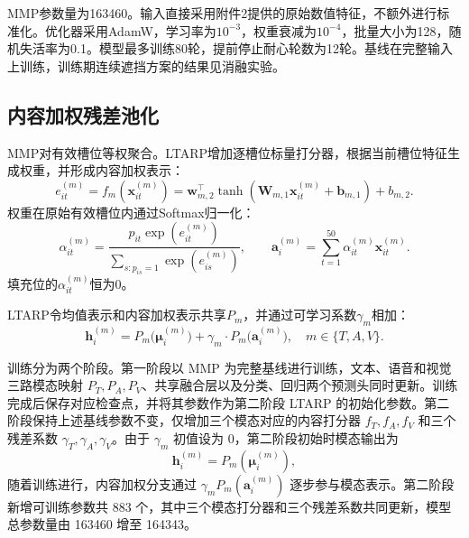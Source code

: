 \documentclass[UTF8,a4paper,11pt]{ctexart}
\begin{document}
MMP参数量为163460。输入直接采用附件2提供的原始数值特征，不额外进行标准化。优化器采用AdamW，学习率为$10^{-3}$，权重衰减为$10^{-4}$，批量大小为128，随机失活率为0.1。模型最多训练80轮，提前停止耐心轮数为12轮。基线在完整输入上训练，训练期连续遮挡方案的结果见消融实验。

\subsection{内容加权残差池化}\label{subsec:q2_pool}
MMP对有效槽位等权聚合。LTARP增加逐槽位标量打分器，根据当前槽位特征生成权重，并形成内容加权表示：
\begin{equation}
e_{it}^{(m)} = f_m(\mathbf x_{it}^{(m)}) = \mathbf w_{m,2}^\top \tanh(\mathbf W_{m,1} \mathbf x_{it}^{(m)} + \mathbf b_{m,1}) + b_{m,2}.
\end{equation}
权重在原始有效槽位内通过Softmax归一化：
\begin{equation}
\alpha_{it}^{(m)} = \frac{p_{it}\exp(e_{it}^{(m)})}{\sum_{s: p_{is}=1} \exp(e_{is}^{(m)})},\qquad
\mathbf a_i^{(m)} = \sum_{t=1}^{50} \alpha_{it}^{(m)} \mathbf x_{it}^{(m)}.
\label{eq:q2_alpha_softmax}
\end{equation}
填充位的$\alpha_{it}^{(m)}$恒为0。

LTARP令均值表示和内容加权表示共享$P_m$，并通过可学习系数$\gamma_m$相加：
\begin{equation}
\mathbf h_i^{(m)} = P_m\big(\boldsymbol\mu_i^{(m)}\big) + \gamma_m \cdot P_m\big(\mathbf a_i^{(m)}\big), \quad m \in \{T, A, V\}.
\label{eq:q2_residual_composite}
\end{equation}

训练分为两个阶段。第一阶段以 MMP 为完整基线进行训练，文本、语音和视觉三路模态映射 $P_T,P_A,P_V$、共享融合层以及分类、回归两个预测头同时更新。训练完成后保存对应检查点，并将其参数作为第二阶段 LTARP 的初始化参数。第二阶段保持上述基线参数不变，仅增加三个模态对应的内容打分器 $f_T,f_A,f_V$ 和三个残差系数 $\gamma_T,\gamma_A,\gamma_V$。由于 $\gamma_m$ 初值设为 0，第二阶段初始时模态输出为
\begin{equation}
\mathbf h_i^{(m)} = P_m(\boldsymbol\mu_i^{(m)}),
\end{equation}
随着训练进行，内容加权分支通过 $\gamma_m P_m(\mathbf a_i^{(m)})$ 逐步参与模态表示。第二阶段新增可训练参数共 883 个，其中三个模态打分器和三个残差系数共同更新，模型总参数量由 163460 增至 164343。
\end{document}
